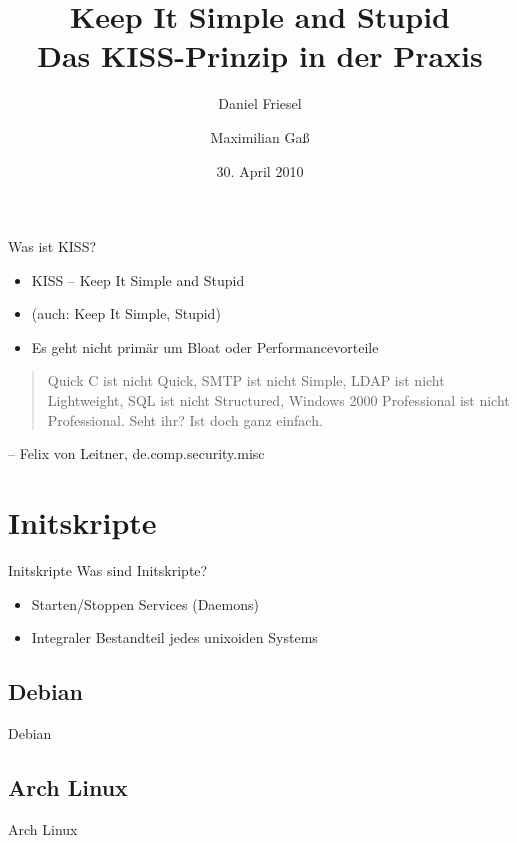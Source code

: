\documentclass{beamer}
\title[Keep It Simple and Stupid]
	{Keep It Simple and Stupid\\Das KISS-Prinzip in der Praxis}
\author{Daniel Friesel \and Maximilian Gaß}
\institute{Chaosdorf}
\date{30. April 2010}
\begin{document}
\begin{frame}
	\titlepage
\end{frame}

\begin{frame}{Was ist KISS?}
	\begin{itemize}
		\item KISS -- Keep It Simple and Stupid
		\item (auch: Keep It Simple, Stupid)
		\item Es geht nicht primär um Bloat oder Performancevorteile
	\end{itemize}
	\pause
	\begin{quote}
		Quick C ist nicht Quick, SMTP ist nicht Simple, LDAP ist nicht
		Lightweight, SQL ist nicht Structured, Windows 2000 Professional
		ist
		nicht Professional.  Seht ihr?  Ist doch ganz einfach.
	\end{quote}
	\begin{flushright}
		-- Felix von Leitner, de.comp.security.misc
	\end{flushright}
\end{frame}

\section{Initskripte}

\begin{frame}{Initskripte}
	Was sind Initskripte?\\

	\begin{itemize}
		\item Starten/Stoppen Services (Daemons)
		\item Integraler Bestandteil jedes unixoiden Systems
	\end{itemize}
\end{frame}

\subsection{Debian}
\begin{frame}{Debian}
	\lstset{basicstyle=\tiny}
	
\end{frame}

\subsection{Arch Linux}
\begin{frame}{Arch Linux}
	\lstset{basicstyle=\tiny}
	
\end{frame}
\end{document}
